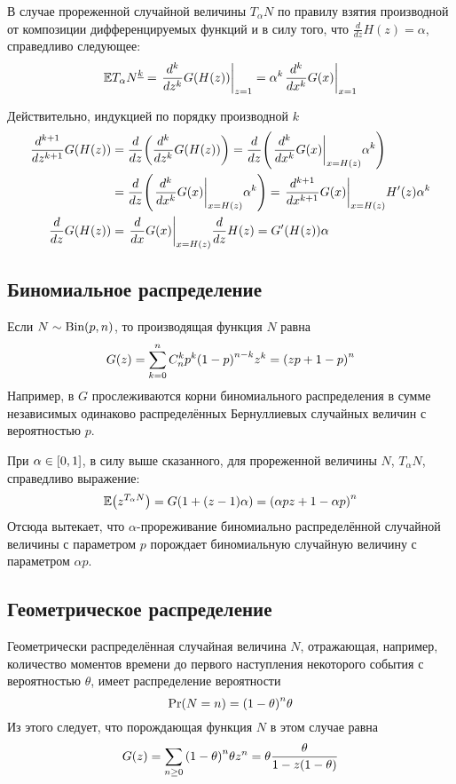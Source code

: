 \documentclass[a4paper]{article}
\let\originalleft\left
\let\originalright\right
\renewcommand{\left}{\mathopen{}\mathclose\bgroup\originalleft}
\renewcommand{\right}{\aftergroup\egroup\originalright}
\newcommand{\clo}[1]{{\left [ #1 \right ]}}
\newcommand{\brac}[1]{{\left ( #1 \right )}}
\newcommand{\induc}[1]{{\left . #1 \right \vert}}
\newcommand{\Ex}[0]{{\mathbb{E}}}
\begin{document}
В случае прореженной случайной величины $T_\alpha N$ по правилу взятия
производной от композиции дифференцируемых функций и в силу того, что
$\frac{d}{dz}H(z) = \alpha$, справедливо следующее: 
\[\Ex {T_\alpha N}^{\underline{k}} = \induc{\frac{d^k}{dz^k} G\brac{H(z)} }_{z=1}
= \alpha^k\induc{\frac{d^k}{dx^k} G(x) }_{x=1}\]

Действительно, индукцией по порядку производной $k$ \begin{align*}
	\frac{d^{k+1}}{dz^{k+1}} G\brac{H(z)} & = \frac{d}{dz}\brac{ \frac{d^k}{dz^k} G\brac{H(z)} } = \frac{d}{dz}\brac{ \induc{\frac{d^k}{dx^k} G(x) }_{x=H(z)} \alpha^k }\\
	& = \frac{d}{dz}\brac{ \induc{\frac{d^k}{dx^k} G(x) }_{x=H(z)} \alpha^k } = \induc{\frac{d^{k+1}}{dx^{k+1}} G(x) }_{x=H(z)} H'(z) \alpha^k\\
	\frac{d}{dz} G\brac{H(z)} & = \induc{\frac{d}{dx} G(x) }_{x=H(z)} \frac{d}{dz} H(z) = G'\brac{H(z)} \alpha
\end{align*}


\subsection{Биномиальное распределение} %
\label{sub:binomial}

Если $N\sim\text{Bin}\brac{p,n}$, то производящая функция $N$ равна
\[G(z) = \sum_{k=0}^n C_n^k p^k \brac{1-p}^{n-k} z^k = \brac{ zp + 1-p }^n\]
Например, в $G$ прослеживаются корни биномиального распределения в сумме
независимых одинаково распределённых Бернуллиевых случайных величин
с вероятностью $p$.

При $\alpha\in \clo{0,1}$, в силу выше сказанного, для прореженной
величины $N$, $T_\alpha N$, справедливо выражение:
\[\Ex\brac{z^{T_\alpha N}} = G\brac{1 + (z-1) \alpha} = \brac{ \alpha p z + 1 - \alpha p }^n\]
Отсюда вытекает, что $\alpha$-прореживание биномиально распределённой
случайной величины с параметром $p$ порождает биномиальную случайную величину
с параметром $\alpha p$.


\subsection{Геометрическое распределение} %
\label{sub:geometric}

Геометрически распределённая случайная величина $N$, отражающая, например,
количество моментов времени до первого наступления некоторого события с вероятностью $\theta$, имеет
распределение вероятности
\[\Pr(N=n) = \brac{1-\theta}^n \theta \]
Из этого следует, что порождающая функция $N$ в этом случае равна
\[G(z) = \sum_{n\geq 0} \brac{1-\theta}^n \theta z^n = \theta \frac{\theta}{1 - z (1-\theta)}\]
\end{document}
